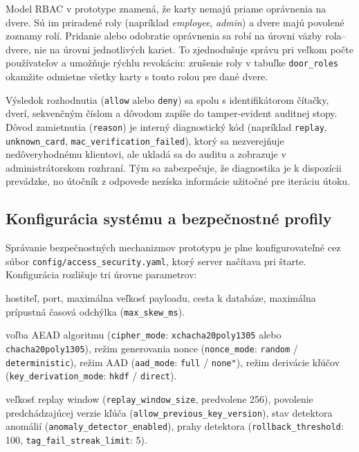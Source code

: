 \documentclass[journal,a4paper,onecolumn]{IEEEtran}
\begin{document}
Model RBAC v prototype znamená, že karty nemajú priame oprávnenia na dvere. Sú im priradené roly (napríklad \emph{employee}, \emph{admin}) a dvere majú povolené zoznamy rolí. Pridanie alebo odobratie oprávnenia sa robí na úrovni väzby rola--dvere, nie na úrovni jednotlivých kariet. To zjednodušuje správu pri veľkom počte používateľov a umožňuje rýchlu revokáciu: zrušenie roly v tabuľke \texttt{door\_roles} okamžite odmietne všetky karty s touto rolou pre dané dvere.

Výsledok rozhodnutia (\texttt{allow} alebo \texttt{deny}) sa spolu s identifikátorom čítačky, dverí, sekvenčným číslom a dôvodom zapíše do tamper-evident auditnej stopy. Dôvod zamietnutia (\texttt{reason}) je interný diagnostický kód (napríklad \texttt{replay}, \texttt{unknown\_card}, \texttt{mac\_verification\_failed}), ktorý sa nezverejňuje nedôveryhodnému klientovi, ale ukladá sa do auditu a zobrazuje v administrátorskom rozhraní. Tým sa zabezpečuje, že diagnostika je k dispozícii prevádzke, no útočník z odpovede nezíska informácie užitočné pre iteráciu útoku.

\subsection{Konfigurácia systému a bezpečnostné profily}

Správanie bezpečnostných mechanizmov prototypu je plne konfigurovateľné cez súbor \texttt{config/access\_security.yaml}, ktorý server načítava pri štarte. Konfigurácia rozlišuje tri úrovne parametrov:

\begin{description}[leftmargin=*,itemsep=2pt]
  \item[Serverové parametre:] hostiteľ, port, maximálna veľkosť payloadu, cesta k databáze, maximálna prípustná časová odchýlka (\texttt{max\_skew\_ms}).
  \item[Kryptografické parametre:] voľba AEAD algoritmu (\texttt{cipher\_mode}: \texttt{xchacha20poly1305} alebo \texttt{chacha20poly1305}), režim generovania nonce (\texttt{nonce\_mode}: \texttt{random} / \texttt{deterministic}), režim AAD (\texttt{aad\_mode}: \texttt{full} / \texttt{none"}), režim derivácie kľúčov (\texttt{key\_derivation\_mode}: \texttt{hkdf} / \texttt{direct}).
  \item[Prevádzkové parametre:] veľkosť replay window (\texttt{replay\_window\_size}, predvolene 256), povolenie predchádzajúcej verzie kľúča (\texttt{allow\_previous\_key\_version}), stav detektora anomálií (\texttt{anomaly\_detector\_enabled}), prahy detektora (\texttt{rollback\_threshold}: 100, \texttt{tag\_fail\_streak\_limit}: 5).
\end{description}
\end{document}
